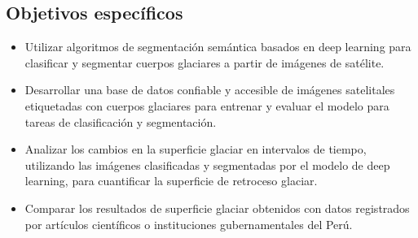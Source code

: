 	\subsection{Objetivos específicos}
	\begin{itemize}

		\item Utilizar algoritmos de segmentación semántica basados en deep learning para clasificar y segmentar cuerpos glaciares a partir de imágenes de satélite.
		\item Desarrollar una base de datos confiable y accesible de imágenes satelitales etiquetadas con cuerpos glaciares para entrenar y evaluar el modelo para tareas de clasificación y segmentación.
		\item Analizar los cambios en la superficie glaciar en intervalos de tiempo, utilizando las imágenes clasificadas y segmentadas por el modelo de deep learning, para cuantificar la superficie de retroceso glaciar.
		\item Comparar los resultados de superficie glaciar obtenidos con datos registrados por artículos científicos o instituciones gubernamentales del Perú. 
	\end{itemize}
